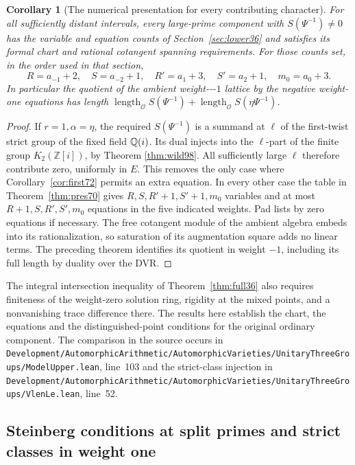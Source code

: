 \documentclass[a4paper,11pt]{article}
\newtheorem{corollary}[proposition]{Corollary}
\theoremstyle{definition}
\theoremstyle{remark}
\newcommand{\ZZ}{\mathbb Z}\newcommand{\ord}{\operatorname{ord}}
\newcommand{\len}{\operatorname{length}}\newcommand{\Res}{\operatorname*{Res}}
\newcommand{\srcloc}[2]{{\small\nolinkurl{#1.lean}}, line~#2}
\numberwithin{equation}{section}
\newcommand{\OO}{\mathcal O}
\begin{document}
\begin{corollary}[The numerical presentation for every contributing character]
\label{cor:present116}
For all sufficiently distant intervals, every large-prime
component with \(S(\Psi^{-1})\ne0\) has the variable and equation
counts of Section~\ref{sec:lower36} and satisfies its formal
chart and rational cotangent spanning requirements. For those
counts set, in the order used in that section,
\[
  R=a_{-1}+2,\quad S=a_{-2}+1,\quad
  R'=a_1+3,\quad S'=a_2+1,\quad m_0=a_0+3 .
\]
In particular the quotient of the ambient weight-\(-1\) lattice
by the negative weight-one equations has length
\(\len_\OO S(\Psi^{-1})+\len_\OO S(\eta\Psi^{-1})\).
\end{corollary}
\begin{proof}
If \(r=1,\alpha=\eta\), the required \(S(\Psi^{-1})\) is a
summand at \(\ell\) of the first-twist strict group of the fixed
field \(\mathbb Q(i)\). Its dual injects into the \(\ell\)-part of
the finite group \(K_2(\ZZ[i])\), by Theorem \ref{thm:wild98}.
All sufficiently large \(\ell\) therefore contribute zero,
uniformly in \(E\). This removes the only case where
Corollary~\ref{cor:first72} permits an extra equation.
In every other case the table in Theorem~\ref{thm:pres70}
gives \(R,S,R'+1,S'+1,m_0\) variables and at most
\(R+1,S,R',S',m_0\) equations in the five indicated weights.
Pad lists by zero equations if necessary. The free cotangent
module of the ambient algebra embeds into its rationalization,
so saturation of its augmentation square adds no linear terms.
The preceding theorem identifies its quotient in weight
\(-1\), including its full length by duality over the DVR.
\end{proof}

The integral intersection inequality of Theorem~\ref{thm:full36}
also requires finiteness of the weight-zero solution ring,
rigidity at the mixed points, and a nonvanishing trace difference
there. The results here establish the chart, the equations and
the distinguished-point conditions for the original ordinary
component. The comparison in the source occurs in
\srcloc{Development/AutomorphicArithmetic/AutomorphicVarieties/UnitaryThreeGroups/ModelUpper}{103}
and the strict-class injection in
\srcloc{Development/AutomorphicArithmetic/AutomorphicVarieties/UnitaryThreeGroups/VlenLe}{52}.


\subsection{Steinberg conditions at split primes and strict classes in weight one}
\label{sec:steintangent616}
\end{document}
